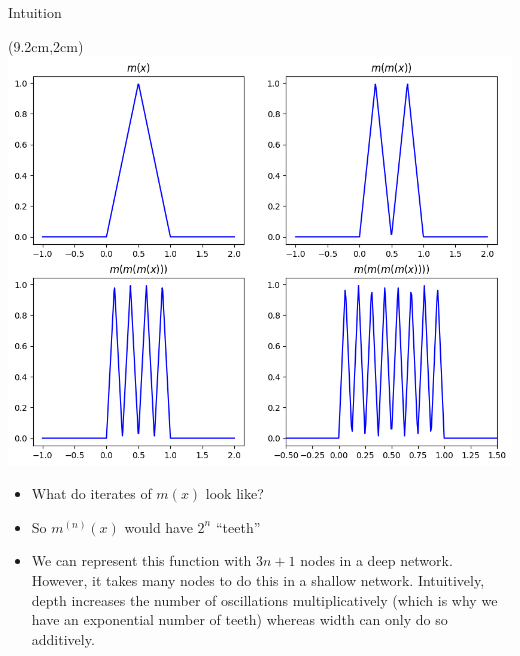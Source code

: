 \documentclass[serif, aspectratio=169]{beamer}
\begin{document}
\begin{frame}{Intuition}
	\begin{textblock*}{5cm}(9.2cm,2cm) %
		\includegraphics[keepaspectratio, scale=0.3]{pic/saw}
	\end{textblock*}
	\begin{itemize}
		\item What do iterates of $m(x)$ look like?
		\item So $m^{(n)}(x)$ would have $2^n$ “teeth”
		\item We can represent this function with $3n+1$ \newline nodes in a deep network. However, it takes \newline many nodes to do this in a shallow network. \newline Intuitively, depth increases the number of \newline oscillations multiplicatively (which is why \newline we have an exponential number of teeth) \newline whereas width can only do so additively.
	\end{itemize}
\end{frame}
\end{document}
